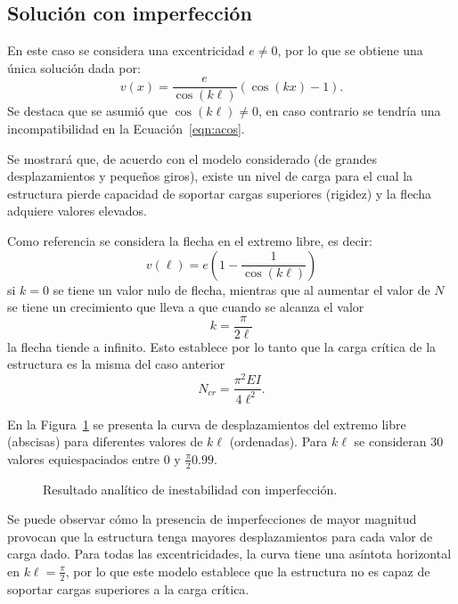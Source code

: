 \subsection{Solución con imperfección}

En este caso se considera una excentricidad $e \neq 0$, por lo que se obtiene una única solución dada por:
%
\begin{equation}
v(x) = \frac{e}{\cos(k\ell)} (\cos(k x) -1).
\end{equation}
%
Se destaca que se asumió que $\cos(k \ell) \neq 0$, en caso contrario se tendría una incompatibilidad en la Ecuación~\eqref{eqn:acos}. %

Se mostrará que, de acuerdo con el modelo considerado (de grandes desplazamientos y pequeños giros), existe un nivel de carga para el cual la estructura pierde capacidad de soportar cargas superiores (rigidez) y la flecha adquiere valores elevados. %
%

Como referencia se considera la flecha en el extremo libre, es decir:
%
\begin{equation}
v(\ell) = e \left( 1- \frac{1}{\cos(k\ell) }  \right)
\end{equation}
%
si $k=0$ se tiene un valor nulo de flecha, mientras que al aumentar el valor de $N$ se tiene un crecimiento que lleva a que cuando se alcanza el valor 
%
\begin{equation}
k = \frac{\pi}{2 \ell }
\end{equation}
%
la flecha tiende a infinito. %
%
Esto establece por lo tanto que la carga crítica de la estructura es la misma del caso anterior
%
\begin{equation}
\boxed{
	N_{cr} = \frac{\pi^2 E I}{4 \ell^2}.
}
\end{equation}


En la Figura~\ref{fig:ejpand} se presenta la curva de desplazamientos del extremo libre (abscisas) para diferentes valores de $k\ell$ (ordenadas). %
%
Para $k\ell$ se consideran 30 valores equiespaciados entre $0$ y $\frac{\pi}{2} 0.99$.

\begin{figure}[htb]
	\centering
		\resizebox{.7\textwidth}{!}{}
	\caption{Resultado analítico de inestabilidad con imperfección.}
	\label{fig:ejpand}
\end{figure}

Se puede observar cómo la presencia de imperfecciones de mayor magnitud provocan que la estructura tenga mayores desplazamientos para cada valor de carga dado. %
%
Para todas las excentricidades, la curva tiene una asíntota horizontal en $k\ell=\frac{\pi}{2}$, por lo que este modelo establece que la estructura no es capaz de soportar cargas superiores a la carga crítica.


